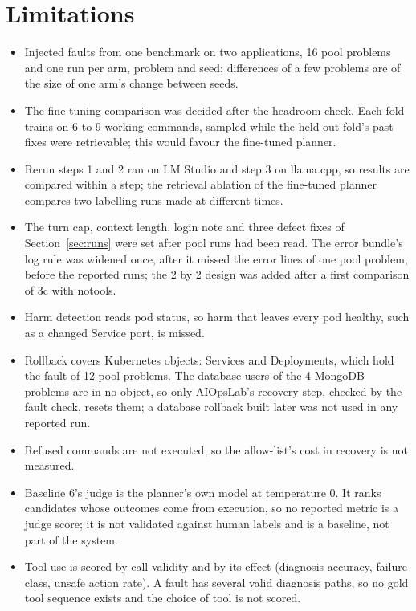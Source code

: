 \documentclass[10pt,conference]{IEEEtran}
\begin{document}
\section{Limitations}
\label{sec:limits}

\begin{itemize}
\item Injected faults from one benchmark on two applications, 16 pool problems and one run per
arm, problem and seed; differences of a few problems are of the size of one arm's change between
seeds.
\item The fine-tuning comparison was decided after the headroom check. Each fold trains on 6 to 9
working commands, sampled while the held-out fold's past fixes were retrievable; this would favour
the fine-tuned planner.
\item Rerun steps 1 and 2 ran on LM Studio and step 3 on llama.cpp, so results are compared within
a step; the retrieval ablation of the fine-tuned planner compares two labelling runs made at
different times.
\item The turn cap, context length, login note and three defect fixes of Section~\ref{sec:runs}
were set after pool runs had been read. The error bundle's log rule was widened once, after it missed the error lines of one pool
problem, before the reported runs; the 2 by 2 design was added after a first comparison of 3c with notools.
\item Harm detection reads pod status, so harm that leaves every pod healthy, such as a changed
Service port, is missed.
\item Rollback covers Kubernetes objects: Services and Deployments, which hold the fault of 12 pool
problems. The database users of the 4 MongoDB problems are in no object, so only AIOpsLab's
recovery step, checked by the fault check, resets them; a database rollback built later was not
used in any reported run.
\item Refused commands are not executed, so the allow-list's cost in recovery is not measured.
\item Baseline 6's judge is the planner's own model at temperature 0. It ranks candidates whose
outcomes come from execution, so no reported metric is a judge score; it is not validated against
human labels and is a baseline, not part of the system.
\item Tool use is scored by call validity and by its effect (diagnosis accuracy, failure class,
unsafe action rate). A fault has several valid diagnosis paths, so no gold tool sequence exists and
the choice of tool is not scored.
\end{itemize}
\end{document}
